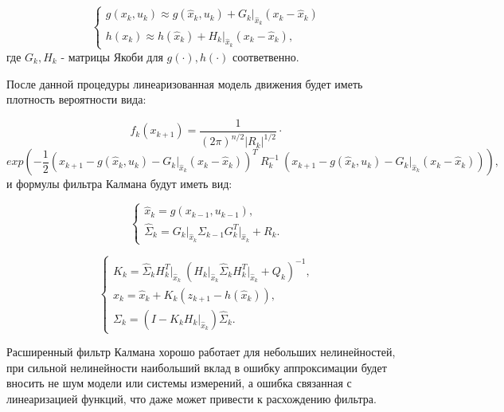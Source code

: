 \documentclass[12pt, a4paper]{article}
\begin{document}
\begin{equation}
\begin{cases}
g(x_k, u_k) \approx g(\widehat{x}_k, u_k) + G_k \big|_{\widehat{x}_k} (x_k - \widehat{x}_k)\\
h(x_k) \approx h(\widehat{x}_k) + H_k \big|_{\widehat{x}_k}(x_k - \widehat{x}_k),
\end{cases}
\end{equation} 
где $G_k, H_k$ - матрицы Якоби для $g(\cdot), h(\cdot)$ соответвенно.

После данной процедуры линеаризованная модель движения будет иметь плотность вероятности вида:

\begin{equation}
f_k(x_{k+1}) = \frac{1}{(2\pi)^{n/2} \vert R_k \vert^{1/2}} \cdot
\end{equation} 
\[exp\left(-\frac{1}{2}(x_{k+1} -g(\widehat{x}_k, u_k) - G_k \big|_{\widehat{x}_k} (x_k - \widehat{x}_k))^T \: R_k^{-1} \:(x_{k+1} -g(\widehat{x}_k, u_k) - G_k \big|_{\widehat{x}_k} (x_k - \widehat{x}_k))\right), \]
и формулы фильтра Калмана будут иметь вид:

\begin{equation}
\begin{cases}
\widehat{x}_{k} = g(x_{k-1}, u_{k-1}), \\
\widehat{\Sigma}_k = G_k\big|_{\widehat{x}_k}\Sigma_{k-1}G_k^T\big|_{\widehat{x}_k} + R_k.
\end{cases}
\end{equation}

\begin{equation}
\begin{cases}
K_k = \widehat{\Sigma}_k H_k^T\big|_{\widehat{x}_k} \:(H_k\big|_{\widehat{x}_k} \widehat{\Sigma}_k H_k^T\big|_{\widehat{x}_k} + Q_k)^{-1}, \\
x_k = \widehat{x}_{k} + K_k(z_{k+1} - h( \widehat{x}_{k})), \\
\Sigma_k = (I - K_k H_k\big|_{\widehat{x}_k})\widehat{\Sigma}_k.
\end{cases}
\end{equation}

Расширенный фильтр Калмана хорошо работает для небольших нелинейностей, при сильной нелинейности наибольший вклад в ошибку аппроксимации будет вносить не шум модели или системы измерений, а ошибка связанная с линеаризацией функций, что даже может привести к расхождению фильтра.

\begin{figure}[htp]
\label{ris:foto3.png}
\end{figure}
\end{document}

